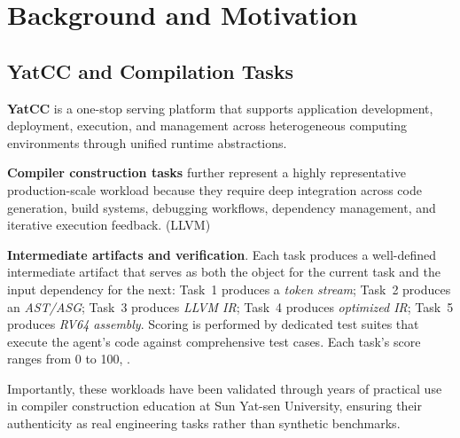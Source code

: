 \section{Background and Motivation}
\subsection{YatCC and Compilation Tasks}


{\bf YatCC} is a one-stop serving platform that supports application development, deployment, execution, and management across heterogeneous computing environments through unified runtime abstractions.

{\bf Compiler construction tasks} further represent a highly representative production-scale workload because they require deep integration across code generation, build systems, debugging workflows, dependency management, and iterative execution feedback. (LLVM)

{\bf Intermediate artifacts and verification}.
Each task produces a well-defined intermediate artifact that serves as both the  object for the current task and the input dependency for the next:
Task~1 produces a \emph{token stream}; Task~2 produces an \emph{AST/ASG}; Task~3 produces \emph{LLVM IR}; Task~4 produces \emph{optimized IR}; Task~5 produces \emph{RV64 assembly}.
Scoring is performed by dedicated test suites that execute the agent's code against comprehensive test cases.
Each task's score ranges from 0 to 100, .

Importantly, these workloads have been validated through years of practical use in compiler construction education at Sun Yat-sen University, ensuring their authenticity as real engineering tasks rather than synthetic benchmarks.



